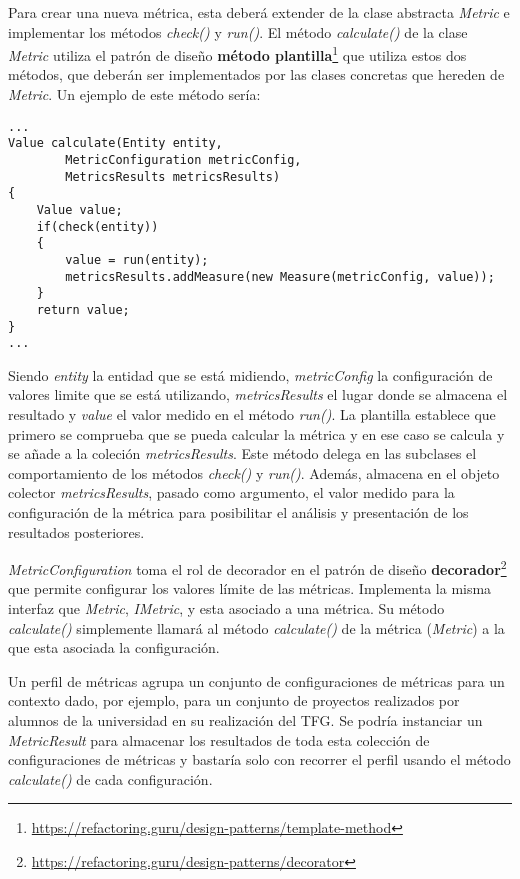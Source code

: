 Para crear una nueva métrica, esta deberá extender de la clase abstracta \textit{Metric} e implementar los métodos \textit{check()} y \textit{run()}. El método \textit{calculate()} de la clase \textit{Metric} utiliza el patrón de diseño \textbf{método plantilla}\footnote{\url{https://refactoring.guru/design-patterns/template-method}} que utiliza estos dos métodos, que deberán ser implementados por las clases concretas que hereden de \textit{Metric}. Un ejemplo de este método sería:

\begin{lstlisting}
...
Value calculate(Entity entity, 
		MetricConfiguration metricConfig, 
		MetricsResults metricsResults) 
{
	Value value;
	if(check(entity))
	{
		value = run(entity);
		metricsResults.addMeasure(new Measure(metricConfig, value));
	}
	return value;
}
...
\end{lstlisting}

Siendo \textit{entity} la entidad que se está midiendo, \textit{metricConfig} la configuración de valores limite que se está utilizando, \textit{metricsResults} el lugar donde se almacena el resultado y \textit{value} el valor medido en el método \textit{run()}. La plantilla establece que primero se comprueba que se pueda calcular la métrica y en ese caso se calcula y se añade a la coleción \textit{metricsResults}. 
Este método delega en las subclases el comportamiento de los métodos \textit{check()} y \textit{run()}. Además, almacena en el objeto colector \textit{metricsResults}, pasado como argumento, el valor medido para la configuración de la métrica para posibilitar el análisis y presentación de los resultados posteriores.

\textit{MetricConfiguration} toma el rol de decorador en el patrón de diseño \textbf{decorador}\footnote{\url{https://refactoring.guru/design-patterns/decorator}} que permite configurar los valores límite de las métricas. Implementa la misma interfaz que \textit{Metric}, \textit{IMetric}, y esta asociado a una métrica. Su método \textit{calculate()} simplemente llamará al método \textit{calculate()} de la métrica (\textit{Metric}) a la que esta asociada la configuración.

Un perfil de métricas agrupa un conjunto de configuraciones de métricas para un contexto dado, por ejemplo, para un conjunto de proyectos realizados por alumnos de la universidad en su realización del TFG. Se podría instanciar un \textit{MetricResult} para almacenar los resultados de toda esta colección de configuraciones de métricas y bastaría solo con recorrer el perfil usando el método \textit{calculate()} de cada configuración.

